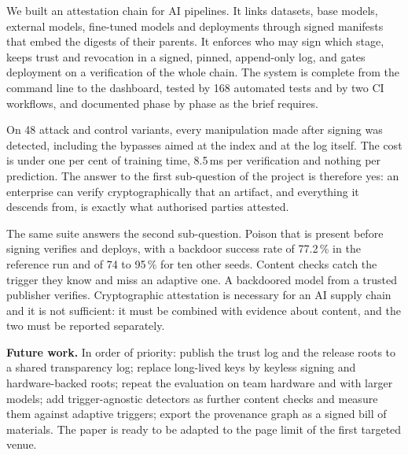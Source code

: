 
We built an attestation chain for AI pipelines. It links datasets, base models, external models, fine-tuned
models and deployments through signed manifests that embed the digests of their parents. It enforces who may
sign which stage, keeps trust and revocation in a signed, pinned, append-only log, and gates deployment on a
verification of the whole chain. The system is complete from the command line to the dashboard, tested by 168
automated tests and by two CI workflows, and documented phase by phase as the brief requires.

On 48 attack and control variants, every manipulation made after signing was detected, including the bypasses
aimed at the index and at the log itself. The cost is under one per cent of training time, 8.5\,ms per
verification and nothing per prediction. The answer to the first sub-question of the project is therefore yes:
an enterprise can verify cryptographically that an artifact, and everything it descends from, is exactly what
authorised parties attested.

The same suite answers the second sub-question. Poison that is present before signing verifies and deploys,
with a backdoor success rate of 77.2\,\% in the reference run and of 74 to 95\,\% for ten other seeds. Content
checks catch the trigger they know and miss an adaptive one. A backdoored model from a trusted publisher
verifies. Cryptographic attestation is necessary for an AI supply chain and it is not sufficient: it must be
combined with evidence about content, and the two must be reported separately.

\textbf{Future work.} In order of priority: publish the trust log and the release roots to a shared
transparency log; replace long-lived keys by keyless signing and hardware-backed roots; repeat the evaluation
on team hardware and with larger models; add trigger-agnostic detectors as further content checks and measure
them against adaptive triggers; export the provenance graph as a signed bill of materials. The paper is ready
to be adapted to the page limit of the first targeted venue.
